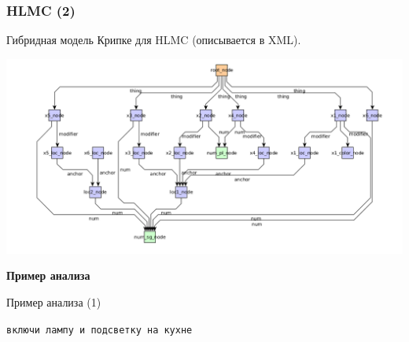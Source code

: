 \documentclass{beamer}
\begin{document}
\begin{frame}[fragile]
\frametitle{HLMC (2)}
Гибридная модель Крипке для HLMC (описывается в XML).
\begin{center}
	\includegraphics[scale=0.3]{model.png}
\end{center}
\end{frame}


\begin{frame}{}
\begin{center}
	\textbf{Пример анализа}
\end{center}
\end{frame}

\begin{frame}{Пример анализа (1)}
\begin{center}
\texttt{включи лампу и подсветку на кухне
}\end{center}
\end{frame}
\end{document}
